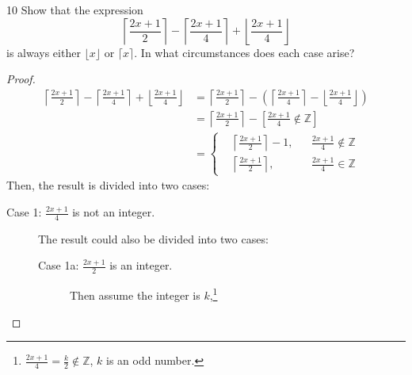 \documentclass[a4paper,12pt]{article}
\theoremstyle{definition}
\newenvironment{problems}{\begin{list}{}{\renewcommand{\makelabel}[1]{\textbf{##1}\hfil}}}{\end{list}}
\begin{document}
\begin{problems}
    \item[10]Show that the expression
    \begin{equation*}
        \left\lceil\frac{2x+1}{2}\right\rceil - \left\lceil\frac{2x+1}{4}\right\rceil + \left\lfloor\frac{2x+1}{4}\right\rfloor
    \end{equation*} 
    is always either $\lfloor x \rfloor$ or $\lceil x \rceil$. In what circumstances does each case arise?
    \begin{proof}
        \begin{align}
            \left\lceil\frac{2x+1}{2}\right\rceil - \left\lceil\frac{2x+1}{4}\right\rceil + \left\lfloor\frac{2x+1}{4}\right\rfloor &= \left\lceil\frac{2x+1}{2}\right\rceil - \left(\left\lceil\frac{2x+1}{4}\right\rceil - \left\lfloor\frac{2x+1}{4}\right\rfloor\right)\nonumber\\
            &=\left\lceil\frac{2x+1}{2}\right\rceil - \left[ \frac{2x+1}{4}\not\in \mathbb{Z} \right]\nonumber\\
            &=\left\{\begin{aligned}
                &\left\lceil\frac{2x+1}{2}\right\rceil - 1, && \frac{2x+1}{4}\not\in \mathbb{Z}\\
                &\left\lceil\frac{2x+1}{2}\right\rceil, && \frac{2x+1}{4}\in \mathbb{Z}
            \end{aligned}\right.
            \label{eq:100}
        \end{align}
        Then, the result is divided into two cases:
        \begin{description}
            \item[Case 1: $\frac{2x+1}{4}$ is not an integer.] The result could also be divided into two cases:
            \begin{description}
                \item[Case 1a: $\frac{2x+1}{2}$ is an integer.] Then assume the integer is $k$,\footnote{$\frac{2x+1}{4}=\frac{k}{2}\not\in\mathbb{Z}$, $k$ is an odd number.}
                \begin{equation}\label{eq:101}

\end{equation}
\end{description}
\end{description}
\end{proof}
\end{problems}
\end{document}

